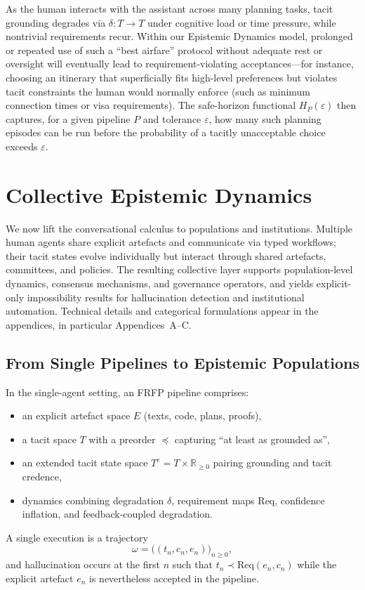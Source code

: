 As the human interacts with the assistant across many planning tasks, tacit grounding degrades via \(\delta : T \to T\) under cognitive load or time pressure, while nontrivial requirements recur. Within our Epistemic Dynamics model, prolonged or repeated use of such a ``best airfare'' protocol without adequate rest or oversight will eventually lead to requirement-violating acceptances—for instance, choosing an itinerary that superficially fits high-level preferences but violates tacit constraints the human would normally enforce (such as minimum connection times or visa requirements). The safe-horizon functional \(H_P(\varepsilon)\) then captures, for a given pipeline \(P\) and tolerance \(\varepsilon\), how many such planning episodes can be run before the probability of a tacitly unacceptable choice exceeds \(\varepsilon\).


\section{Collective Epistemic Dynamics}
\label{sec:collective-epistemic-dynamics}

We now lift the conversational calculus to populations and institutions. Multiple human agents share explicit artefacts and communicate via typed workflows; their tacit states evolve individually but interact through shared artefacts, committees, and policies. The resulting collective layer supports population-level dynamics, consensus mechanisms, and governance operators, and yields explicit-only impossibility results for hallucination detection and institutional automation. Technical details and categorical formulations appear in the appendices, in particular Appendices~A--C.


\subsection{From Single Pipelines to Epistemic Populations}

In the single-agent setting, an FRFP pipeline comprises:
\begin{itemize}
  \item an explicit artefact space $E$ (texts, code, plans, proofs),
  \item a tacit space $T$ with a preorder $\preceq$ capturing ``at least as grounded as'',
  \item an extended tacit state space $T^e = T \times \mathbb{R}_{\ge 0}$ pairing grounding and tacit credence,
  \item dynamics combining degradation $\delta$, requirement maps $\mathrm{Req}$, confidence inflation, and feedback-coupled degradation.
\end{itemize}
A single execution is a trajectory
\[
  \omega = \bigl( (t_n,c_n,e_n) \bigr)_{n \ge 0},
\]
and hallucination occurs at the first $n$ such that $t_n \prec \mathrm{Req}(e_n,c_n)$ while the explicit artefact $e_n$ is nevertheless accepted in the pipeline.

